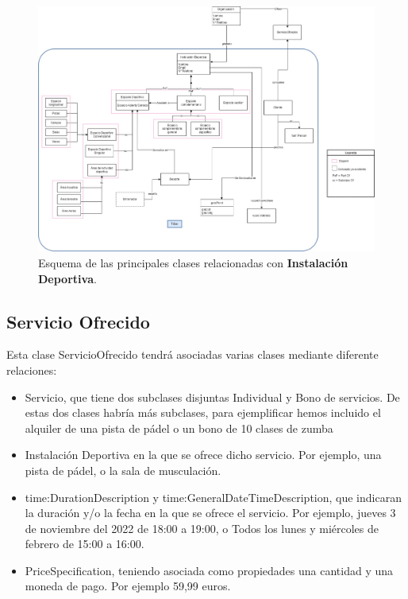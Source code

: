 \documentclass[a4paper,12pt]{article}
\begin{document}
	\begin{figure}[H]
		\centering
		\includegraphics[width=\textwidth]{include/tbox.jpg}
		\caption{Esquema de las principales clases relacionadas con \textbf{Instalación Deportiva}.}
	\end{figure}
		
	\subsection{Servicio Ofrecido}
	
	Esta clase ServicioOfrecido tendrá asociadas varias clases mediante diferente relaciones:
	
	\begin{itemize}
		\item Servicio, que tiene dos subclases disjuntas Individual y Bono de servicios. De estas dos
	clases habría más subclases, para ejemplificar hemos incluido el alquiler de una pista de
	pádel o un bono de 10 clases de zumba
		\item Instalación Deportiva en la que se ofrece dicho servicio. Por ejemplo, una pista de pádel,
o la sala de musculación.
		\item time:DurationDescription y time:GeneralDateTimeDescription, que indicaran la
duración y/o la fecha en la que se ofrece el servicio. Por ejemplo, jueves 3 de noviembre	del 2022 de 18:00 a 19:00, o Todos los lunes y miércoles de febrero de 15:00 a 16:00.
		\item PriceSpecification, teniendo asociada como propiedades una cantidad y una moneda de
pago. Por ejemplo 59,99 euros.
	\end{itemize}
	
\end{document}

